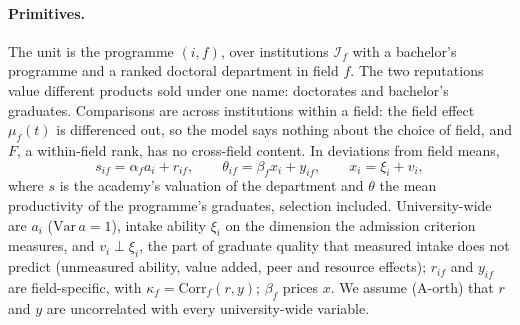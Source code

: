 \paragraph{Primitives.} The unit is the programme $(i,f)$, over institutions $\mathcal I_f$ with a bachelor's
programme and a ranked doctoral department in field $f$. The two reputations value different
products sold under one name: doctorates and bachelor's graduates. Comparisons are across institutions
within a field: the field effect $\mu_f(t)$ is differenced out, so the model says nothing about the choice of field,
and $F$, a within-field rank, has no cross-field content. In deviations from field means,
\begin{equation}\label{eq:thy-latent}
s_{if}=\alpha_fa_i+r_{if},\qquad \theta_{if}=\beta_fx_i+y_{if},\qquad x_i=\xi_i+v_i,
\end{equation}
where $s$ is the academy's valuation of the department and $\theta$ the mean productivity of the programme's
graduates, selection included. University-wide are $a_i$ ($\mathrm{Var}\,a=1$), intake ability $\xi_i$ on the
dimension the admission criterion measures, and $v_i\perp\xi_i$, the part of graduate quality that measured intake
does not predict (unmeasured ability, value added, peer and resource effects);
$r_{if}$ and $y_{if}$ are field-specific, with $\kappa_f=\mathrm{Corr}_f(r,y)$; $\beta_f$ prices $x$. We assume
(A-orth) that $r$ and $y$ are uncorrelated with every university-wide variable.

